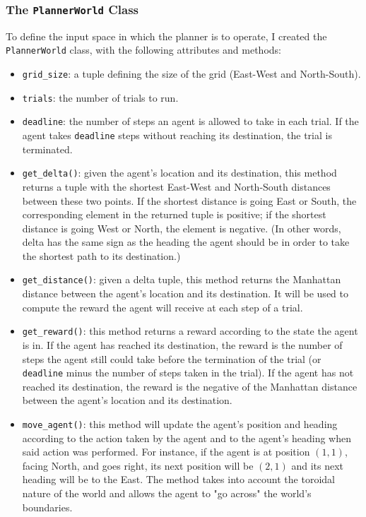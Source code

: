 \documentclass{article}
\begin{document}
\subsubsection{The \texttt{PlannerWorld} Class}

To define the input space in which the planner is to operate, I created the \texttt{PlannerWorld} class, with the following attributes and methods:

\begin{itemize}
    \item \texttt{grid\_size}: a tuple defining the size of the grid (East-West and North-South).
    \item \texttt{trials}: the number of trials to run.
    \item \texttt{deadline}: the number of steps an agent is allowed to take in each trial. If the agent takes \texttt{deadline} steps without reaching its destination, the trial is terminated.
    
    \item \texttt{get\_delta()}: given the agent's location and its destination, this method returns a tuple with the shortest East-West and North-South distances between these two points. If the shortest distance is going East or South, the corresponding element in the returned tuple is positive; if the shortest distance is going West or North, the element is negative. (In other words, delta has the same sign as the heading the agent should be in order to take the shortest path to its destination.)
    
    \item \texttt{get\_distance()}: given a delta tuple, this method returns the Manhattan distance between the agent's location and its destination. It will be used to compute the reward the agent will receive at each step of a trial.
    
    \item \texttt{get\_reward()}: this method returns a reward according to the state the agent is in. If the agent has reached its destination, the reward is the number of steps the agent still could take before the termination of the trial (or \texttt{deadline}  minus the number of steps taken in the trial). If the agent has not reached its destination, the reward is the negative of the Manhattan distance between the agent's location and its destination. 
    
    \item \texttt{move\_agent()}: this method will update the agent's position and heading according to the action taken by the agent and to the agent's heading when said action was performed. For instance, if the agent is at position $(1, 1)$, facing North, and goes right, its next position will be $(2, 1)$ and its next heading will be to the East. The method takes into account the toroidal nature of the world and allows the agent to "go across" the world's boundaries.
    

\end{itemize}
\end{document}
